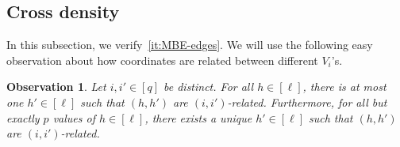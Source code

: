 \documentclass[10pt,a4paper]{article}
\newcommand{\V}[1]{\mathbold{#1}}
\newtheorem{lemma}[theorem]{Lemma}
\newtheorem{observation}[theorem]{Observation}
\theoremstyle{definition}
\newcommand{\cB}{\mathcal{B}}
\begin{document}
%








\subsection{Cross density}
In this subsection, we verify~\ref{it:MBE-edges}. We will use the following easy observation about how coordinates are related between different $V_i$'s.
\begin{observation}\label{obs-relatedcoord}
	Let $i,i'\in [q]$ be distinct. For all $h \in [\ell]$, there is at most one $h' \in [\ell]$ such that $(h,h')$ are $(i,i')$-related. 
	Furthermore, for all but exactly $p$ values of $h\in [\ell]$, there exists a unique $h'\in[\ell]$ such that $(h,h')$ are $(i,i')$-related.
\end{observation}
\end{document}
